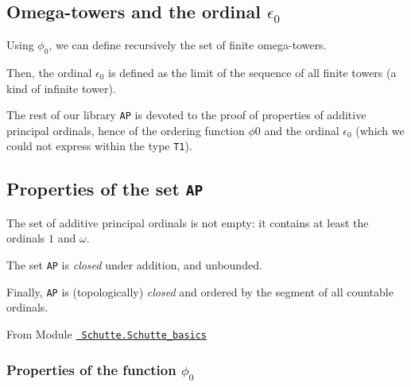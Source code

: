 {\subsection{Omega-towers and the ordinal \texorpdfstring{$\epsilon_0$}{epsilon0}}


Using $\phi_0$, we can define recursively the set of finite omega-towers.





\label{sect:epsilon0-as-limit}
Then, the ordinal  $\epsilon_0$ is defined as the limit of the sequence of all finite towers (a kind of infinite tower).




The rest of our library \texttt{AP} is devoted to the proof of properties of additive principal ordinals, hence of the ordering function  $\phi0$ and the ordinal $\epsilon_0$ (which we could not express within the type \texttt{T1}).

\subsection{Properties of the set  \texttt{AP}}

The set of additive principal ordinals is not empty: it contains at least the ordinals  $1$ and  $\omega$. 


The set  \texttt{AP} is  \emph{closed} under addition, and unbounded.
\label{lemma:AP-plus-closed}





Finally, \texttt{AP} is (topologically) \emph{closed} and ordered by the segment of all countable ordinals.


From Module \href{../theories/html/hydras.Schutte.Schutte_basics.html}%
{\texttt{~Schutte.Schutte\_basics}}






\subsubsection{Properties of the function \texorpdfstring{$\phi_0$}{phi0}}
 
}
